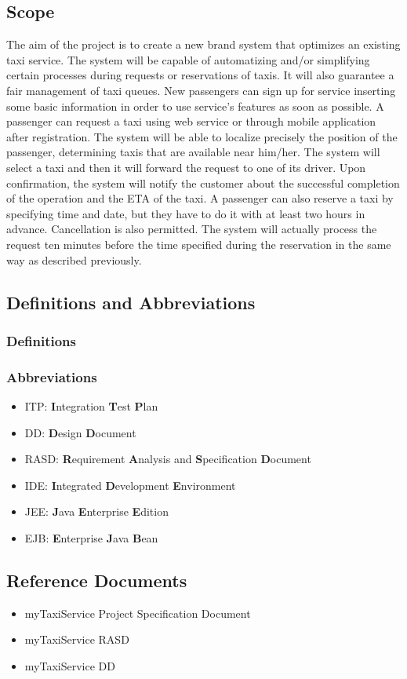\subsection{Scope}
The aim of the project is to create a new brand system that optimizes an 
existing taxi service.
The system will be capable of automatizing and/or simplifying certain 
processes during requests or reservations of taxis.
It will also guarantee a fair management of taxi queues.
New passengers can sign up for service inserting some basic information in order to use service's features as soon as possible.
A passenger can request a taxi using web service or through mobile
application after registration. The system will be able to localize precisely the position
of the passenger, determining taxis that are available near
him/her. The system will select a taxi and then it will forward the request to one of its driver.
Upon confirmation, the system will notify the customer about the successful completion of the operation and the ETA of the taxi. A passenger can also reserve a taxi by specifying time and date, but they have to do it with at least two hours in advance. Cancellation is also permitted. The system will actually process the request ten minutes before the time specified during the reservation in the same way as described previously.
\subsection{Definitions and Abbreviations}
\subsubsection{Definitions}
\subsubsection{Abbreviations}
\begin{itemize}
	\item ITP: \textbf{I}ntegration \textbf{T}est \textbf{P}lan
	\item DD: \textbf{D}esign \textbf{D}ocument
	\item RASD: \textbf{R}equirement \textbf{A}nalysis and \textbf{S}pecification \textbf{D}ocument
	\item IDE: \textbf{I}ntegrated \textbf{D}evelopment \textbf{E}nvironment
	\item JEE: \textbf{J}ava \textbf{E}nterprise \textbf{E}dition
	\item EJB: \textbf{E}nterprise \textbf{J}ava \textbf{B}ean
\end{itemize}
\subsection{Reference Documents}
\begin{itemize}
	\item myTaxiService Project Specification Document
	\item myTaxiService RASD
	\item myTaxiService DD
\end{itemize}